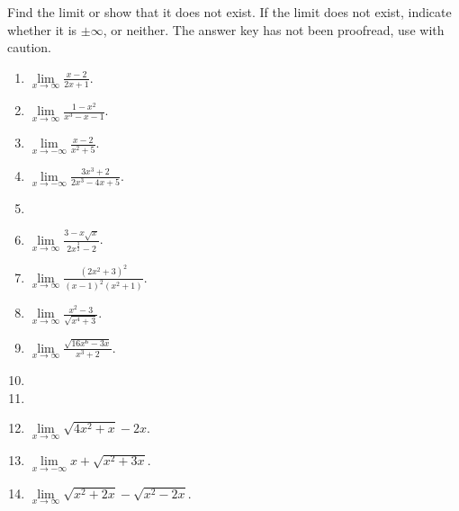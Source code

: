 Find the limit or show that it does not exist. If the limit does not exist, indicate whether it is $\pm\infty$, or neither. The answer key has not been proofread, use with caution.
\begin{multicols}{3}
\begin{enumerate}[ref={\fcProblemRef}]
\item $\displaystyle \lim\limits_{x\to\infty }\frac{x-2}{2x+1}$.

\item $\displaystyle \lim\limits_{x\to\infty }\frac{1-x^2}{x^3-x-1}$.

\item $\displaystyle \lim\limits_{x\to-\infty }\frac{x-2}{x^2+5}$.

\item \label{problemlimxtominusinfty(3x^3+2)/(2x^3-4x+5)} $\displaystyle \lim\limits_{x\to-\infty }\frac{3x^3+2}{2x^3-4x+5}$.

\item 
\item $\displaystyle \lim\limits_{x\to\infty }\frac{3-x\sqrt{x}}{2x^{\frac{3}{2}}-2}$.

\item $\displaystyle \lim\limits_{x\to\infty }\frac{(2x^2+3)^2}{(x-1)^2(x^2+1)}$.

\item $\displaystyle \lim\limits_{x\to\infty }\frac{x^2-3}{\sqrt{x^4+3}}$.

\item $\displaystyle \lim\limits_{x\to\infty }\frac{\sqrt{16x^6-3x}}{x^3+2}$.

\item 
\item 
\item $\displaystyle \lim\limits_{x\to\infty}\sqrt{4x^2+x}-2x$.

\item $\displaystyle \lim\limits_{x\to-\infty} x+\sqrt{x^2+3x} $.

\item $\lim\limits_{x \to\infty}\sqrt{x^2+2x}- \sqrt{ x^2 -2x} $. 


\end{enumerate}
\end{multicols}
